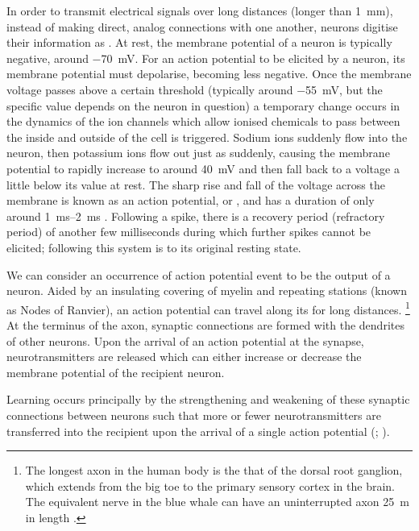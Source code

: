 In order to transmit electrical signals over long distances (longer than \SI{1}{\milli\metre}), instead of making direct, analog connections with one another, neurons digitise their information as .
At rest, the membrane potential of a neuron is typically negative, around \SI{-70}{\milli\volt}.
For an action potential to be elicited by a neuron, its membrane potential must depolarise, becoming less negative.
Once the membrane voltage passes above a certain threshold (typically around \SI{-55}{\milli\volt}, but the specific value depends on the neuron in question) a temporary change occurs in the dynamics of the ion channels which allow ionised chemicals to pass between the inside and outside of the cell is triggered.
Sodium ions suddenly flow into the neuron, then potassium ions flow out just as suddenly, causing the membrane potential to rapidly increase to around \SI{+40}{\milli\volt} and then fall back to a voltage a little below its value at rest.
The sharp rise and fall of the voltage across the membrane is known as an action potential, or , and has a duration of only around \SIrange{1}{2}{\milli\second} \citep[Chapter~1]{Dayan2001}.
Following a spike, there is a recovery period (refractory period) of another few milliseconds during which further spikes cannot be elicited; following this system is to its original resting state.

We can consider an occurrence of action potential event to be the output of a neuron.
Aided by an insulating covering of myelin and repeating stations (known as Nodes of Ranvier), an action potential can travel along its  for long distances.%
\footnote{
The longest axon in the human body is the that of the dorsal root ganglion, which extends from the big toe to the primary sensory cortex in the brain.
The equivalent nerve in the blue whale can have an uninterrupted axon \SI{25}{\metre} in length \citep{Smith2009,Voytek2012}.
}
At the terminus of the axon, synaptic connections are formed with the dendrites of other neurons.
Upon the arrival of an action potential at the synapse, neurotransmitters are released which can either increase or decrease the membrane potential of the recipient neuron.

Learning occurs principally by the strengthening and weakening of these synaptic connections between neurons such that more or fewer neurotransmitters are transferred into the recipient upon the arrival of a single action potential (\citealp[Chapter~23]{nsbook}; \citealp[Chapter~8]{Dayan2001}).


